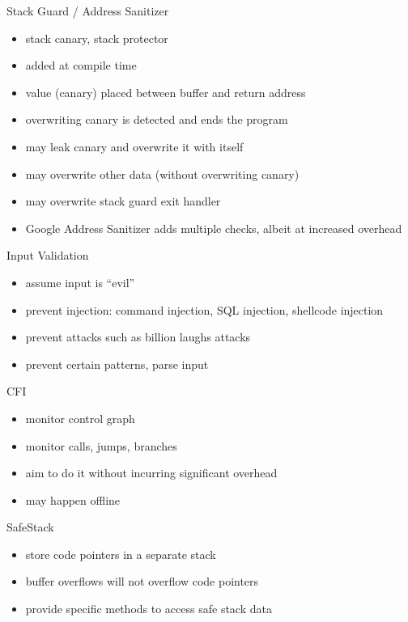 \documentclass{curs}
\begin{document}
\begin{frame}{Stack Guard / Address Sanitizer}
  \begin{itemize}
    \item stack canary, stack protector
    \item added at compile time
    \item value (canary) placed between buffer and return address
    \item overwriting canary is detected and ends the program
    \item may leak canary and overwrite it with itself
    \item may overwrite other data (without overwriting canary)
    \item may overwrite stack guard exit handler
    \item Google Address Sanitizer adds multiple checks, albeit at increased overhead
  \end{itemize}
\end{frame}

\begin{frame}{Input Validation}
  \begin{itemize}
    \item assume input is ``evil''
    \item prevent injection: command injection, SQL injection, shellcode injection
    \item prevent attacks such as billion laughs attacks
    \item prevent certain patterns, parse input
  \end{itemize}
\end{frame}

\begin{frame}{CFI}
  \begin{itemize}
    \item monitor control graph
    \item monitor calls, jumps, branches
    \item aim to do it without incurring significant overhead
    \item may happen offline
  \end{itemize}
\end{frame}

\begin{frame}{SafeStack}
  \begin{itemize}
    \item store code pointers in a separate stack
    \item buffer overflows will not overflow code pointers
    \item provide specific methods to access safe stack data
  \end{itemize}
\end{frame}
\end{document}
